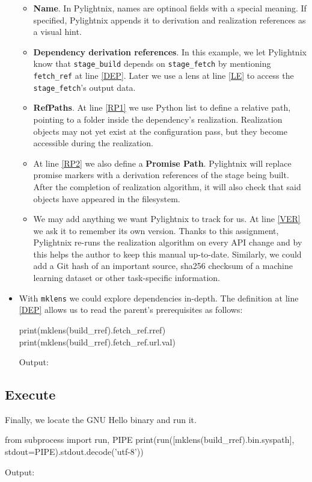 \begin{itemize}
    \begin{itemize}

      \item \textbf{Name}. In Pylightnix, names are optinoal fields with a special
        meaning. If specified, Pylightnix appends it to derivation and
        realization references as a visual hint.

      \item \textbf{Dependency derivation references}. In this example, we let
        Pylightnix know that \texttt{stage\_build} depends on
        \texttt{stage\_fetch} by mentioning \texttt{fetch\_ref} at line
        \ref{DEP}. Later we use a lens at line \ref{LE} to access the
        \texttt{stage\_fetch}'s output data.

      \item \textbf{RefPaths}. At line \ref{RP1} we use Python list to define a
        relative path, pointing to a folder inside the dependency's realization.
        Realization objects may not yet exist at the configuration pass, but
        they become accessible during the realization.

      \item At line \ref{RP2} we also define a \textbf{Promise Path}. Pylightnix
        will replace promise markers with a derivation references of the stage
        being built. After the completion of realization algorithm, it will also
        check that said objects have appeared in the filesystem.

      \item We may add anything we want Pylightnix to track for us. At line
        \ref{VER} we ask it to remember its own version. Thanks to this
        assignment, Pylightnix re-runs the realization algorithm on every API
        change and by this helps the author to keep this manual up-to-date.
        Similarly, we could add a Git hash of an important source, sha256
        checksum of a machine learning dataset or other task-specific
        information.

    \end{itemize}

  \item With \texttt{mklens} we could explore dependencies in-depth. The
    definition at line \ref{DEP} allows us to read the parent's prerequisites as
    follows:

    \begin{pythontexcode}
    print(mklens(build_rref).fetch_ref.rref)
    print(mklens(build_rref).fetch_ref.url.val)
    \end{pythontexcode}

    Output:

    \mysmallstdout

\end{itemize}

\pagebreak
\subsection{Execute}

Finally, we locate the GNU Hello binary and run it.

\begin{pythontexcode}
from subprocess import run, PIPE
print(run([mklens(build_rref).bin.syspath], stdout=PIPE).stdout.decode('utf-8'))
\end{pythontexcode}

Output:

\mystdout


